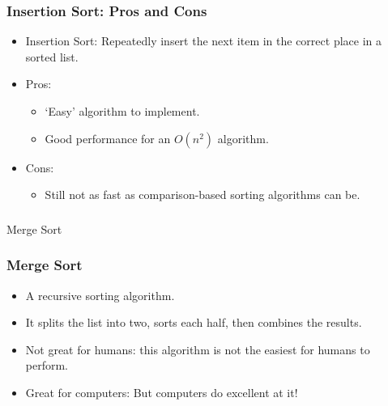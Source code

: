 \begin{frame}
	\frametitle{Insertion Sort: Pros and Cons}
			\begin{itemize}
				\item Insertion Sort:	Repeatedly insert the next item in the correct place in a sorted list.
				\item Pros:
			\begin{itemize}
				\item `Easy' algorithm to implement.
				\item Good performance for an $O(n^2)$ algorithm.
			\end{itemize}
				\item Cons:
			\begin{itemize}
				\item Still not as fast as comparison-based sorting algorithms can be.
			\end{itemize}
		\end{itemize}	
	
\end{frame}

\begin{frame}[fragile]\frametitle{}
\begin{center}
{\Large Merge Sort}
\end{center}

\end{frame}

\begin{frame}
	\frametitle{Merge Sort}
			\begin{itemize}
				\item A recursive sorting algorithm.
				\item It splits the list into two, sorts each half, then combines the results.

				\item Not great for humans: this algorithm is not the easiest for humans to perform.
				\item Great for computers:	But computers do excellent at it!
	\end{itemize}	
\end{frame}

